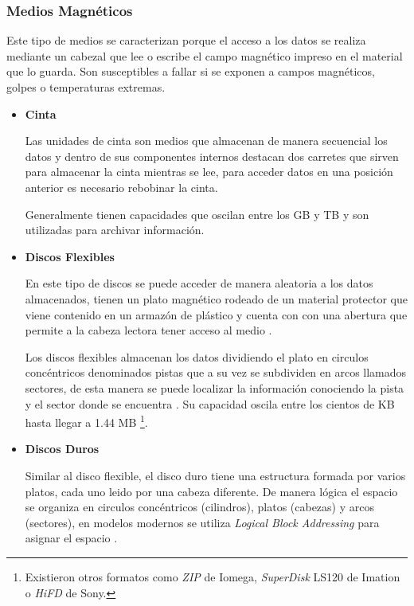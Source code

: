 \newpage
      \subsubsection*{Medios Magn\'{e}ticos}

Este tipo de medios se caracterizan porque el acceso a los datos se realiza mediante un cabezal que lee o escribe el campo magn\'{e}tico impreso en el material que lo guarda. Son susceptibles a fallar si se exponen a campos magn\'{e}ticos, golpes o temperaturas extremas.

\begin{itemize}

  \item \textbf{Cinta}

Las unidades de cinta son medios que almacenan de manera secuencial los datos y dentro de sus componentes internos destacan dos carretes que sirven para almacenar la cinta mientras se lee, para acceder datos en una posici\'{o}n anterior es necesario rebobinar la cinta.

Generalmente tienen capacidades que oscilan entre los \textsc{GB} y \textsc{TB}  \cite{_powervault_????} y son utilizadas para archivar informaci\'{o}n.

  \item \textbf{Discos Flexibles}

En este tipo de discos se puede acceder de manera aleatoria a los datos almacenados, tienen un plato magn\'{e}tico rodeado de un material protector que viene contenido en un armaz\'{o}n de pl\'{a}stico y cuenta con con una abertura que permite a la cabeza lectora tener acceso al medio \cite{_anatomy_????}.

Los discos flexibles almacenan los datos dividiendo el plato en circulos conc\'{e}ntricos denominados pistas que a su vez se subdividen en arcos llamados sectores, de esta manera se puede localizar la informaci\'{o}n conociendo la pista y el sector donde se encuentra \cite{_illustrated_????}. Su capacidad oscila entre los cientos de \textsc{KB} hasta llegar a 1.44 \textsc{MB} \footnote{Existieron otros formatos como \textit{ZIP} de Iomega, \textit{SuperDisk} LS120 de Imation o \textit{HiFD} de Sony.}.

  \item \textbf{Discos Duros}

Similar al disco flexible, el disco duro tiene una estructura formada por varios platos, cada uno leido por una cabeza diferente. De manera l\'{o}gica el espacio se organiza en circulos conc\'{e}ntricos (cilindros), platos (cabezas) y arcos (sectores), en modelos modernos se utiliza \emph{Logical Block Addressing} para asignar el espacio \cite{_introduction_????}.


\end{itemize}
